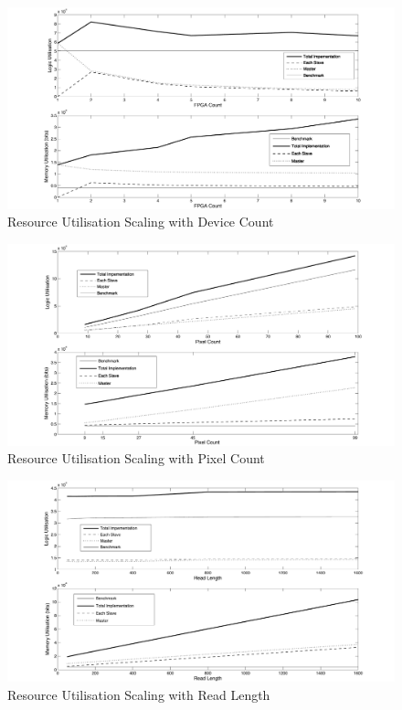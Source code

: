 \begin{figure}[p]
  \centering
  \includegraphics[height=0.4\textheight]{./figs/eps/fpga_count.pdf}
  \caption{Resource Utilisation Scaling with Device Count}
    \label{fig:fpgacount}
\end{figure}
\begin{figure}[p]
  \centering
  \includegraphics[height=0.4\textheight]{./figs/eps/pix.pdf}
  \caption{Resource Utilisation Scaling with Pixel Count}
    \label{fig:pix}
\end{figure}
\begin{figure}[p]
  \centering
  \includegraphics[height=0.4\textheight]{./figs/eps/read_length.pdf}
  \caption{Resource Utilisation Scaling with Read Length}
    \label{fig:read}
\end{figure}


